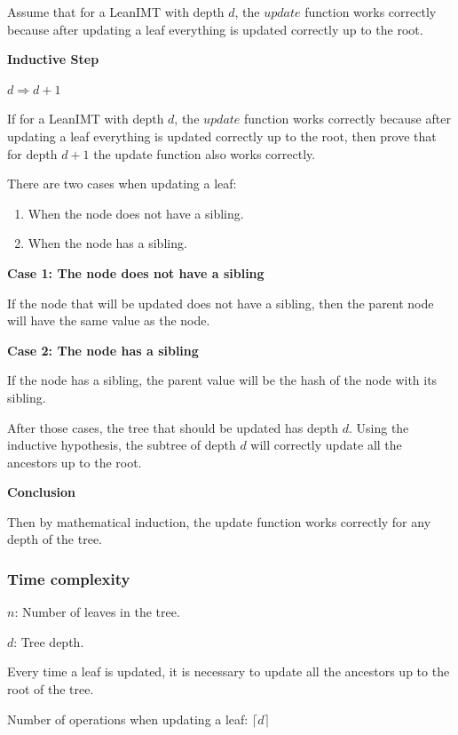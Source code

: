 \documentclass{article}
\begin{document}
Assume that for a LeanIMT with depth $d$, the $update$ function works correctly because after updating a leaf everything is updated correctly up to the root.

\textbf{Inductive Step}

$d \Rightarrow d+1$

If for a LeanIMT with depth $d$, the $update$ function works correctly because after updating a leaf everything is updated correctly up to the root, then prove that for depth $d+1$ the update function also works correctly.

There are two cases when updating a leaf:

\begin{enumerate}
    \item When the node does not have a sibling.
    \item When the node has a sibling.
\end{enumerate}

\textbf{Case 1: The node does not have a sibling}

If the node that will be updated does not have a sibling, then the parent node will have the same value as the node.

\textbf{Case 2: The node has a sibling}

If the node has a sibling, the parent value will be the hash of the node with its sibling.

After those cases, the tree that should be updated has depth $d$. Using the inductive hypothesis, the subtree of depth $d$ will correctly update all the ancestors up to the root.

\textbf{Conclusion}

Then by mathematical induction, the update function works correctly for any depth of the tree.

\subsubsection{Time complexity}
\label{sec:update-time-complexity}


$n$: Number of leaves in the tree.

$d$: Tree depth.



Every time a leaf is updated, it is necessary to update all the ancestors up to the root of the tree.



Number of operations when updating a leaf: $\lceil d \rceil$
\end{document}
